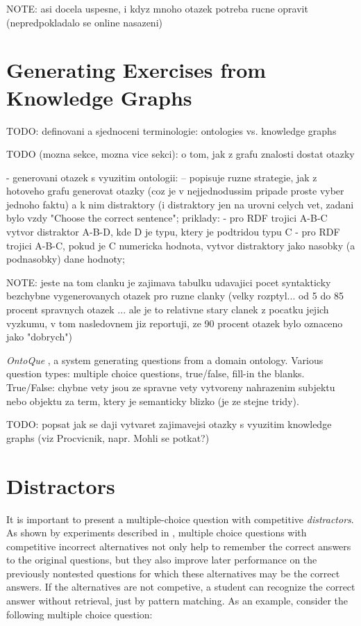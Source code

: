 \documentclass[a4paper, 12pt, twoside]{fithesis2}		%
\renewcommand{\_}{\leavevmode \kern0.0em\vbox{\hrule width0.4em}}
\newcounter{choice}
\begin{document}
NOTE: asi docela uspesne, i kdyz mnoho otazek potreba rucne opravit (nepredpokladalo se online nasazeni)



\section{Generating Exercises from Knowledge Graphs}
\label{sec:irt}

TODO: definovani a sjednoceni terminologie: ontologies vs. knowledge graphs

TODO (mozna sekce, mozna vice sekci): o tom, jak z grafu znalosti dostat otazky

- generovani otazek s vyuzitim ontologii:
\cite{question-gen-domain-ontologies} -- popisuje ruzne strategie, jak z hotoveho grafu generovat otazky (coz je v nejjednodussim pripade proste vyber jednoho faktu) a k nim distraktory (i distraktory jen na urovni celych vet, zadani bylo vzdy "Choose the correct sentence"; priklady:
- pro RDF trojici A-B-C vytvor distraktor A-B-D, kde D je typu, ktery je podtridou typu C
- pro RDF trojici A-B-C, pokud je C numericka hodnota, vytvor distraktory jako nasobky (a podnasobky) dane hodnoty;

NOTE: jeste na tom clanku je zajimava tabulku udavajici pocet syntakticky bezchybne vygenerovanych otazek pro ruzne clanky (velky rozptyl... od 5 do 85 procent spravnych otazek ... ale je to relativne stary clanek z pocatku jejich vyzkumu, v tom nasledovnem jiz reportuji, ze 90 procent otazek bylo oznaceno jako "dobrych")

\textit{OntoQue} \cite{ontoque}, a system generating questions from a domain ontology.
Various question types: multiple choice questions, true/false, fill-in the blanks.
True/False: chybne vety jsou ze spravne vety vytvoreny nahrazenim subjektu nebo objektu za term, ktery je semanticky blizko (je ze stejne tridy).


TODO: popsat jak se daji vytvaret zajimavejsi otazky s vyuzitim knowledge graphs (viz Procvicnik, napr. Mohli se potkat?)


\section{Distractors}
\label{sec:distractors}

It is important to present a multiple-choice question with competitive \textit{distractors}.
As shown by experiments described in \cite{optimizing-multiple-choice}, multiple choice questions with competitive incorrect alternatives not only help to remember the correct answers to the original questions, but they also improve later performance on the previously nontested questions for which these alternatives may be the correct answers. If the alternatives are not competive, a student can recognize the correct answer without retrieval, just by pattern matching. As an example, consider the following multiple choice question:
\end{document}
